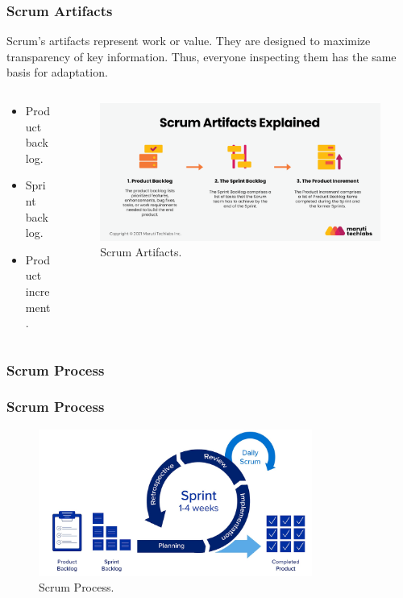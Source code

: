 \documentclass[
	11pt, %
]{beamer}
\begin{document}
\begin{frame}
	\frametitle{Scrum Artifacts}
	Scrum's artifacts represent work or value.
	They are designed to maximize transparency
	of key information. Thus, everyone
	inspecting them has the same basis for
	adaptation.

	\begin{columns}[c] %
		\begin{column}{0.4\textwidth} %
			\begin{itemize} %
				\item Product backlog.
				\item Sprint backlog.
				\item Product increment.
			\end{itemize}
		\end{column}
		\begin{column}{0.7\textwidth} %
			\begin{figure}
				\includegraphics[width=0.8\linewidth]{Scrum_artifact.png}
				\caption{Scrum Artifacts.}
			\end{figure}
		\end{column}
	\end{columns}
\end{frame}

\subsubsection{Scrum Process}

\begin{frame}
	\frametitle{Scrum Process}
	\begin{figure}
		\centering
		\includegraphics[width=0.8\textwidth]{fonc_Scrum.jpg}
		\caption{Scrum Process.}
	\end{figure}

\end{frame}
\end{document}
